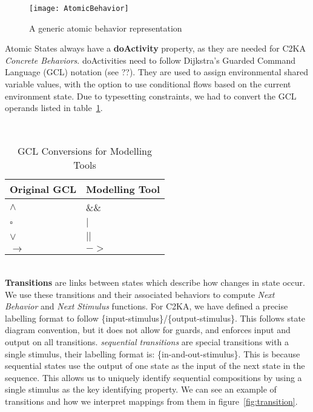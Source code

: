    \begin{figure}[h]
        \centering
        \texttt{[image: AtomicBehavior]}
        \caption{A generic atomic behavior representation}
        \label{fig:atomicBehavior}
    \end{figure}

    Atomic States always have a \textbf{doActivity} property,
    as they are needed for C2KA \textit{Concrete Behaviors}.
    doActivities need to follow Dijkstra's Guarded Command Language (GCL) notation (see ??). %
    They are used to assign environmental shared variable values,
    with the option to use conditional flows based on the current environment state.
    Due to typesetting constraints, we had to convert the GCL operands listed in table~\ref{tab:gcl-equivalence}.
    \begin{table}[htbp]
          \centering
          \caption{GCL Conversions for Modelling Tools}\label{tab:gcl-equivalence}\\
          \begin{tabular}{| l | l |}
              \hline
              \textbf{Original GCL} & \textbf{Modelling Tool} \\
              \hline
              $\land$ & \&\& \\ \hline
              $\square$ & $|$ \\ \hline
              $\lor$ & $||$ \\ \hline
              $\rightarrow$ & $->$ \\ \hline
          \end{tabular}
    \end{table}
    \\

    \textbf{Transitions} are links between states which describe how changes in state occur.
    We use these transitions and their associated behaviors to compute \textit{Next Behavior} and \textit{Next Stimulus} functions.
    For C2KA, we have defined a precise labelling format to follow \{input-stimulus\}/\{output-stimulus\}.
    This follows state diagram convention, but it does not allow for guards,
    and enforces input and output on all transitions.
    \textit{sequential transitions} are special transitions with a single stimulus, their labelling format is: \{in-and-out-stimulus\}.
    This is because sequential states use the output of one state as the input of the next state in the sequence.
    This allows us to uniquely identify sequential compositions by using a single stimulus as the key identifying property.
    We can see an example of transitions and how we interpret mappings from them in figure~\ref{fig:transition}.

